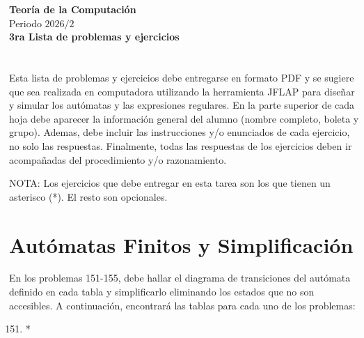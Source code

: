 \documentclass[12pt]{article}
\begin{document}
\begin{center}
        \Large \textbf{Teoría de la Computación} \\
        \large Periodo $2026/2$ \\
        \vspace{0.4cm}
        \Large \textbf{3ra Lista de problemas y ejercicios}
\end{center}

\section*{}Esta lista de problemas y ejercicios debe entregarse en formato PDF y se sugiere que sea realizada en computadora utilizando la herramienta JFLAP para diseñar y simular los autómatas y las expresiones regulares. En la parte superior de cada hoja debe aparecer la información general del alumno (nombre completo, boleta y grupo). Ademas, debe incluir las instrucciones y/o enunciados de cada ejercicio, no solo las respuestas. Finalmente, todas las respuestas de los ejercicios deben ir acompañadas del procedimiento y/o razonamiento.

NOTA: Los ejercicios que debe entregar en esta tarea son los que tienen un asterisco (*). El resto son opcionales.

\section*{Autómatas Finitos y Simplificación}
En los problemas 151-155, debe hallar el diagrama de transiciones del autómata definido en cada tabla y simplificarlo eliminando los estados que no son accesibles. A continuación, encontrará las tablas para cada uno de los problemas:

\begin{enumerate}
	\setcounter{enumi}{150}
	\item*
\end{enumerate}
\end{document}
